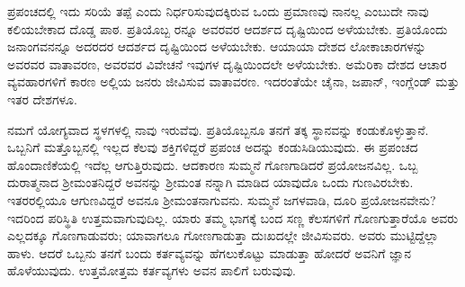 ಪ್ರಪಂಚದಲ್ಲಿ ಇದು ಸರಿಯೆ ತಪ್ಪೆ ಎಂದು ನಿರ್ಧರಿಸುವುದಕ್ಕಿರುವ ಒಂದು ಪ್ರಮಾಣವು ನಾನಲ್ಲ ಎಂಬುದೇ ನಾವು ಕಲಿಯಬೇಕಾದ ದೊಡ್ಡ ಪಾಠ. ಪ್ರತಿಯೊಬ್ಬ ರನ್ನೂ ಅವರವರ ಆದರ್ಶದ ದೃಷ್ಟಿಯಿಂದ ಅಳೆಯಬೇಕು. ಪ್ರತಿಯೊಂದು ಜನಾಂಗವನನ್ನೂ ಅದರದರ ಆದರ್ಶದ ದೃಷ್ಟಿಯಿಂದ ಅಳೆಯಬೇಕು. ಆಯಾಯಾ ದೇಶದ ಲೋಕಾಚಾರಗಳನ್ನು ಅವರವರ ವಾತಾವರಣ, ಅವರವರ ವಿವೇಚನೆ ಇವುಗಳ ದೃಷ್ಟಿಯಿಂದಲೇ ಅಳೆಯಬೇಕು. ಅಮೆರಿಕಾ ದೇಶದ ಆಚಾರ ವ್ಯವಹಾರಗಳಿಗೆ ಕಾರಣ ಅಲ್ಲಿಯ ಜನರು ಜೀವಿಸುವ ವಾತಾವರಣ. ಇದರಂತೆಯೇ ಚೈನಾ, ಜಪಾನ್​, ಇಂಗ್ಲೆಂಡ್​ ಮತ್ತು ಇತರ ದೇಶಗಳೂ.

ನಮಗೆ ಯೋಗ್ಯವಾದ ಸ್ಥಳಗಳಲ್ಲಿ ನಾವು ಇರುವೆವು. ಪ್ರತಿಯೊಬ್ಬನೂ ತನಗೆ ತಕ್ಕ ಸ್ಥಾನವನ್ನು ಕಂಡುಕೊಳ್ಳುತ್ತಾನೆ. ಒಬ್ಬನಿಗೆ ಮತ್ತೊಬ್ಬನಲ್ಲಿ ಇಲ್ಲದ ಕೆಲವು ಶಕ್ತಿಗಳಿದ್ದರೆ ಪ್ರಪಂಚ ಅದನ್ನು ಕಂಡುಸಿಡಿಯುವುದು. ಈ ಪ್ರಪಂಚದ ಹೊಂದಾಣಿಕೆಯಲ್ಲಿ ಇದೆಲ್ಲ ಆಗುತ್ತಿರುವುದು. ಆದಕಾರಣ ಸುಮ್ಮನೆ ಗೊಣಗಾಡಿದರೆ ಪ್ರಯೋಜನವಿಲ್ಲ. ಒಬ್ಬ ದುರಾತ್ಮನಾದ ಶ‍್ರೀಮಂತನಿದ್ದರೆ ಅವನನ್ನು ಶ‍್ರೀಮಂತ ನನ್ನಾಗಿ ಮಾಡಿದ ಯಾವುದೊ ಒಂದು ಗುಣವಿರಬೇಕು. ಇತರರಲ್ಲಿಯೂ ಆಗುಣವಿದ್ದರೆ ಅವನೂ ಶ‍್ರೀಮಂತನಾಗುವನು. ಸುಮ್ಮನೆ ಜಗಳವಾಡಿ, ದೂರಿ ಪ್ರಯೋಜನವೇನು? ಇದರಿಂದ ಪರಿಸ್ಥಿತಿ ಉತ್ತಮವಾಗುವುದಿಲ್ಲ. ಯಾರು ತಮ್ಮ ಭಾಗಕ್ಕೆ ಬಂದ ಸಣ್ಣ ಕೆಲಸಗಳಿಗೆ ಗೊಣಗುತ್ತಾರೆಯೊ ಅವರು ಎಲ್ಲದಕ್ಕೂ ಗೊಣಗಾಡುವರು; ಯಾವಾಗಲೂ ಗೋಣಗಾಡುತ್ತಾ ದುಃಖದಲ್ಲೇ ಜೀವಿಸುವರು. ಅವರು ಮುಟ್ಟಿದ್ದೆಲ್ಲಾ ಹಾಳು. ಆದರೆ ಒಬ್ಬನು ತನಗೆ ಬಂದು ಕರ್ತವ್ಯವನ್ನು ಹೆಗಲುಕೊಟ್ಟು ಮಾಡುತ್ತಾ ಹೋದರೆ ಅವನಿಗೆ ಜ್ಞಾನ ಹೊಳೆಯುವುದು. ಉತ್ತಮೋತ್ತಮ ಕರ್ತವ್ಯಗಳು ಅವನ ಪಾಲಿಗೆ ಬರುವುವು.

